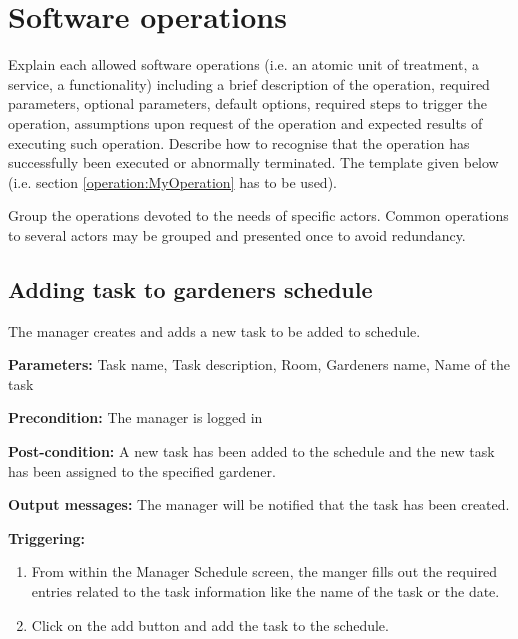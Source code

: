 \chapter{Software operations}
\label{chap:soptware_operations}


Explain each allowed software operations (i.e. an atomic unit of treatment, a service, a functionality) including a brief description of the operation, required parameters, optional parameters, default options, required steps to trigger the operation, assumptions upon request of the operation and expected results of executing such operation.
Describe how to recognise that the operation has successfully been executed or
abnormally terminated. The template given below (i.e. section \ref{operation:MyOperation} has to be used).

Group the operations devoted to the needs of specific actors. Common
operations to several actors may be grouped and presented once to avoid redundancy.


\section{Adding task to gardeners schedule}



\label{operation:addTaskGardener}
The manager creates and adds a new task to be added to schedule.


\begin{description}

\item \textbf{Parameters:} Task name, Task description, Room, Gardeners name,
Name of the task
\item \textbf{Precondition:} The manager is logged in
\item \textbf{Post-condition:} A new task has been added to the schedule and the
new task has been assigned to the specified gardener.
\item \textbf{Output messages:} The manager will be notified that the task has
been created.

\item \textbf{Triggering:}
\begin{enumerate}
\item From within the Manager Schedule screen, the manger fills out the 
required entries related to the task information like the name of the task or
the date.
\item Click on the add button and add the task to the schedule.
\end{enumerate}
\end{description}

